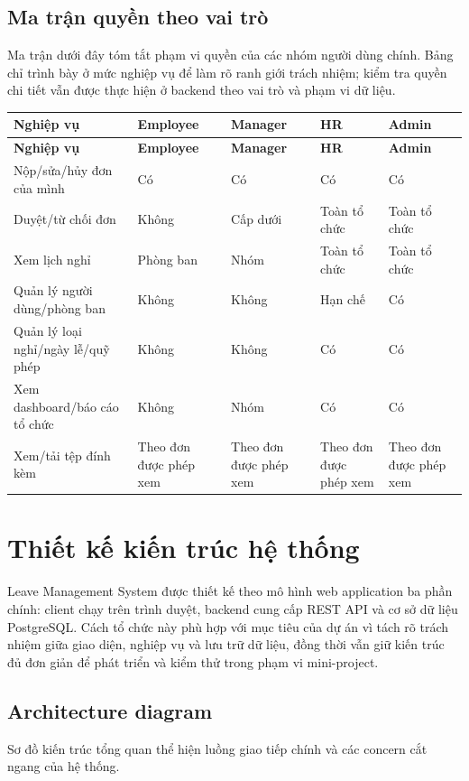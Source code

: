 \subsection{Ma trận quyền theo vai trò}
Ma trận dưới đây tóm tắt phạm vi quyền của các nhóm người dùng chính. Bảng chỉ trình bày ở mức nghiệp vụ để làm rõ ranh giới trách nhiệm; kiểm tra quyền chi tiết vẫn được thực hiện ở backend theo vai trò và phạm vi dữ liệu.

\begin{longtable}{p{}p{}p{}p{}p{}}
\toprule
\textbf{Nghiệp vụ} & \textbf{Employee} & \textbf{Manager} & \textbf{HR} & \textbf{Admin} \\
\midrule
\endfirsthead
\toprule
\textbf{Nghiệp vụ} & \textbf{Employee} & \textbf{Manager} & \textbf{HR} & \textbf{Admin} \\
\midrule
\endhead
Nộp/sửa/hủy đơn của mình & Có & Có & Có & Có \\
Duyệt/từ chối đơn & Không & Cấp dưới & Toàn tổ chức & Toàn tổ chức \\
Xem lịch nghỉ & Phòng ban & Nhóm & Toàn tổ chức & Toàn tổ chức \\
Quản lý người dùng/phòng ban & Không & Không & Hạn chế & Có \\
Quản lý loại nghỉ/ngày lễ/quỹ phép & Không & Không & Có & Có \\
Xem dashboard/báo cáo tổ chức & Không & Nhóm & Có & Có \\
Xem/tải tệp đính kèm & Theo đơn được phép xem & Theo đơn được phép xem & Theo đơn được phép xem & Theo đơn được phép xem \\
\bottomrule
\end{longtable}

\section{Thiết kế kiến trúc hệ thống}
Leave Management System được thiết kế theo mô hình web application ba phần chính: client chạy trên trình duyệt, backend cung cấp REST API và cơ sở dữ liệu PostgreSQL. Cách tổ chức này phù hợp với mục tiêu của dự án vì tách rõ trách nhiệm giữa giao diện, nghiệp vụ và lưu trữ dữ liệu, đồng thời vẫn giữ kiến trúc đủ đơn giản để phát triển và kiểm thử trong phạm vi mini-project.

\subsection{Architecture diagram}
Sơ đồ kiến trúc tổng quan thể hiện luồng giao tiếp chính và các concern cắt ngang của hệ thống.

